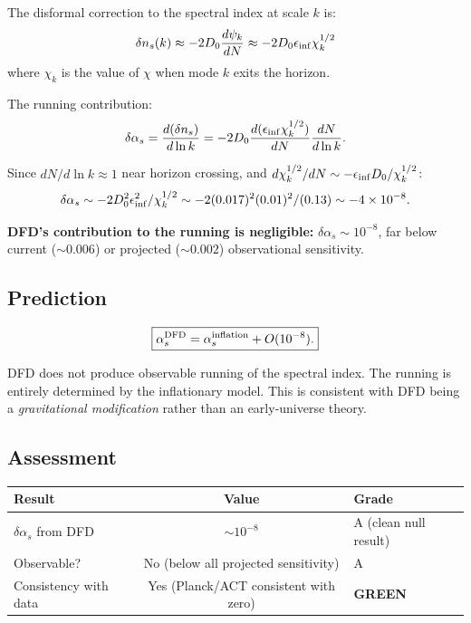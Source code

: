 \documentclass[11pt,a4paper]{article}
\newcommand{\GREEN}{\textcolor{dfdgreen}{\textbf{GREEN}}}
\begin{document}
The disformal correction to the spectral index at scale $k$ is:
\begin{equation}
\delta n_s(k) \approx -2D_0 \frac{d\psi_k}{dN} \approx -2D_0 \epsilon_{\rm inf} \chi_k^{1/2}
\end{equation}
where $\chi_k$ is the value of $\chi$ when mode $k$ exits the horizon.

The running contribution:
\begin{equation}
\delta\alpha_s = \frac{d(\delta n_s)}{d\ln k} = -2D_0\frac{d(\epsilon_{\rm inf}\chi_k^{1/2})}{dN}\frac{dN}{d\ln k}.
\end{equation}

Since $dN/d\ln k \approx 1$ near horizon crossing, and $d\chi_k^{1/2}/dN \sim -\epsilon_{\rm inf}D_0/\chi_k^{1/2}$:
\begin{equation}
\delta\alpha_s \sim -2D_0^2 \epsilon_{\rm inf}^2/\chi_k^{1/2} \sim -2(0.017)^2(0.01)^2/(0.13) \sim -4 \times 10^{-8}.
\end{equation}

\textbf{DFD's contribution to the running is negligible:} $\delta\alpha_s \sim 10^{-8}$, far below current ($\sim 0.006$) or projected ($\sim 0.002$) observational sensitivity.

\subsection{Prediction}

\begin{equation}
\boxed{\alpha_s^{\rm DFD} = \alpha_s^{\rm inflation} + O(10^{-8}).}
\end{equation}

DFD does not produce observable running of the spectral index. The running is entirely determined by the inflationary model. This is consistent with DFD being a \emph{gravitational modification} rather than an early-universe theory.

\subsection{Assessment}

\begin{center}
\begin{tabular}{lcl}
\toprule
\textbf{Result} & \textbf{Value} & \textbf{Grade} \\
\midrule
$\delta\alpha_s$ from DFD & $\sim 10^{-8}$ & A (clean null result) \\
Observable? & No (below all projected sensitivity) & A \\
Consistency with data & Yes (Planck/ACT consistent with zero) & \GREEN \\
\bottomrule
\end{tabular}
\end{center}
\end{document}
